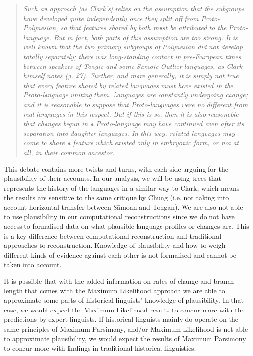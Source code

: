 \documentclass[a4paper,10pt]{article} %
\begin{document}
\begin{quotation}
\noindent\emph{Such an approach [as Clark's] relies on the assumption that the subgroups have developed quite independently once they split off from Proto-Polynesian, so that features shared by both must be attributed to the Proto-language. But in fact, both parts of this assumption are too strong. It is well known that the two primary subgroups of Polynesian did not develop totally separately; there was long-standing contact in pre-European times between speakers of Tongic and some Samoic-Outlier languages, as Clark himself notes (p. 27). Further, and more generally, it is simply not true that every feature shared by related languages must have existed in the Proto-language uniting them. Languages are constantly undergoing change; and it is reasonable to suppose that Proto-languages were no different from real languages in this respect. But if this is so, then it is also reasonable that changes begun in a Proto-language may have continued even after its separation into daughter languages. In this way, related languages may come to share a feature which existed only in embryonic form, or not at all, in their common ancestor.}
\end{quotation}
\begin{flushright} \citet[539]{chung1977aspects}  \end{flushright}

This debate contains more twists and turns, with each side arguing for the plausibility of their accounts. In our analysis, we will be using trees that represents the history of the languages in a similar way to Clark, which means the results are sensitive to the same critique by Chung (i.e. not taking into account horizontal transfer between S\={a}moan and Tongan). We are also not able to use plausibility in our computational reconstructions since we do not have access to formalised data on what plausible language profiles or changes are. This is a key difference between computational reconstruction and traditional approaches to reconstruction. Knowledge of plausibility and how to weigh different kinds of evidence against each other is not formalised and cannot be taken into account.

It is possible that with the added information on rates of change and branch length that comes with the Maximum Likelihood approach we are able to approximate some parts of historical linguists' knowledge of plausibility. In that case, we would expect the Maximum Likelihood results to concur more with the predictions by expert linguists. If historical linguists mainly do operate on the same principles of Maximum Parsimony, and/or Maximum Likelihood is not able to approximate plausibility, we would expect the results of Maximum Parsimony to concur more with findings in traditional historical linguistics.
\end{document}
